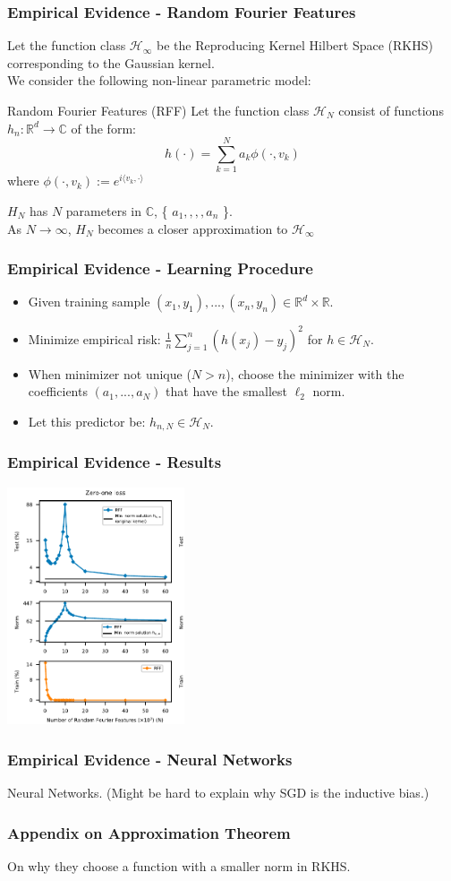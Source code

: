 \documentclass{beamer}
\begin{document}
\begin{frame}
\frametitle{Empirical Evidence - Random Fourier Features}
Let the function class  $\mathcal{H}_\infty$ be the Reproducing Kernel Hilbert Space (RKHS) corresponding to the Gaussian kernel.\\
We consider the following non-linear parametric model:
\begin{block}{Random Fourier Features (RFF)}
	Let the function class  $\mathcal{H}_N $ consist of functions $h_n : \mathbb{R}^d \to \mathbb{C}$ of the form:
	\[ h(\cdot) = \sum_{k=1}^{N} a_k\phi(\cdot, v_k) \] 
	where $\phi(\cdot , v_k) := e^{i
	\langle v_k , \cdot \rangle }$
\end{block}
$H_N$ has $N$ parameters in $\mathbb{C}$, \{ $a_1, ,,, a_n$ \}.\\
As $N \to \infty$, $H_N$ becomes a closer approximation to $\mathcal{H}_\infty$
\end{frame}

\begin{frame}
\frametitle{Empirical Evidence - Learning Procedure}
\begin{itemize}[itemsep = 12pt]
	\item Given training sample $(x_1, y_1), ..., (x_n, y_n) \in \mathbb{R}^d \times \mathbb{R}$.
	\item Minimize empirical risk: $\frac{1}{n}\sum_{j=1}^{n}(h(x_j)-y_j)^2$ for $h \in \mathcal{H}_N$.
	\item When minimizer not unique ($N > n$), choose the minimizer with the coefficients $(a_1, ..., a_N)$ that have the smallest $\ell_2$ norm.
	\item Let this predictor be: $h_{n,N} \in \mathcal{H}_N$.
\end{itemize}
\end{frame}

\begin{frame}
\frametitle{Empirical Evidence - Results}
\centering
\includegraphics[height=7cm]{RFF-results.png}
\end{frame}

\begin{frame}
\frametitle{Empirical Evidence - Neural Networks}
Neural Networks. (Might be hard to explain why SGD is the inductive bias.)
\end{frame}


\begin{frame}
\frametitle{Appendix on Approximation Theorem}
On why they choose a function with a smaller norm in RKHS.
\end{frame}
\end{document}
